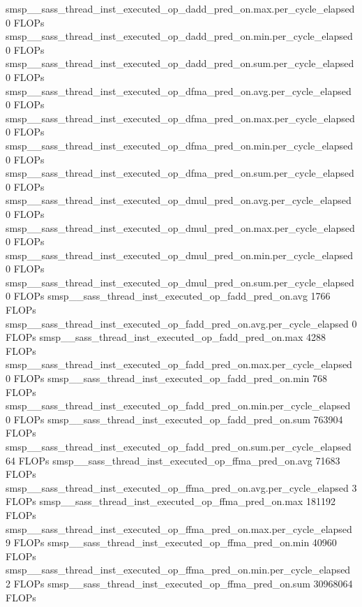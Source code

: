 smsp__sass_thread_inst_executed_op_dadd_pred_on.max.per_cycle_elapsed                          0 FLOPs
smsp__sass_thread_inst_executed_op_dadd_pred_on.min.per_cycle_elapsed                          0 FLOPs
smsp__sass_thread_inst_executed_op_dadd_pred_on.sum.per_cycle_elapsed                          0 FLOPs
smsp__sass_thread_inst_executed_op_dfma_pred_on.avg.per_cycle_elapsed                          0 FLOPs
smsp__sass_thread_inst_executed_op_dfma_pred_on.max.per_cycle_elapsed                          0 FLOPs
smsp__sass_thread_inst_executed_op_dfma_pred_on.min.per_cycle_elapsed                          0 FLOPs
smsp__sass_thread_inst_executed_op_dfma_pred_on.sum.per_cycle_elapsed                          0 FLOPs
smsp__sass_thread_inst_executed_op_dmul_pred_on.avg.per_cycle_elapsed                          0 FLOPs
smsp__sass_thread_inst_executed_op_dmul_pred_on.max.per_cycle_elapsed                          0 FLOPs
smsp__sass_thread_inst_executed_op_dmul_pred_on.min.per_cycle_elapsed                          0 FLOPs
smsp__sass_thread_inst_executed_op_dmul_pred_on.sum.per_cycle_elapsed                          0 FLOPs
smsp__sass_thread_inst_executed_op_fadd_pred_on.avg                                         1766 FLOPs
smsp__sass_thread_inst_executed_op_fadd_pred_on.avg.per_cycle_elapsed                          0 FLOPs
smsp__sass_thread_inst_executed_op_fadd_pred_on.max                                         4288 FLOPs
smsp__sass_thread_inst_executed_op_fadd_pred_on.max.per_cycle_elapsed                          0 FLOPs
smsp__sass_thread_inst_executed_op_fadd_pred_on.min                                          768 FLOPs
smsp__sass_thread_inst_executed_op_fadd_pred_on.min.per_cycle_elapsed                          0 FLOPs
smsp__sass_thread_inst_executed_op_fadd_pred_on.sum                                       763904 FLOPs
smsp__sass_thread_inst_executed_op_fadd_pred_on.sum.per_cycle_elapsed                         64 FLOPs
smsp__sass_thread_inst_executed_op_ffma_pred_on.avg                                        71683 FLOPs
smsp__sass_thread_inst_executed_op_ffma_pred_on.avg.per_cycle_elapsed                          3 FLOPs
smsp__sass_thread_inst_executed_op_ffma_pred_on.max                                       181192 FLOPs
smsp__sass_thread_inst_executed_op_ffma_pred_on.max.per_cycle_elapsed                          9 FLOPs
smsp__sass_thread_inst_executed_op_ffma_pred_on.min                                        40960 FLOPs
smsp__sass_thread_inst_executed_op_ffma_pred_on.min.per_cycle_elapsed                          2 FLOPs
smsp__sass_thread_inst_executed_op_ffma_pred_on.sum                                     30968064 FLOPs
